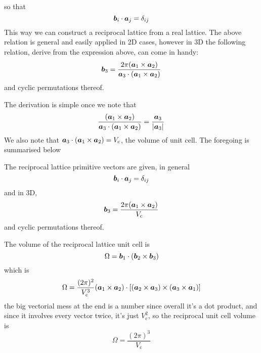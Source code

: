 so that
\begin{equation}
	\boldsymbol{b}_i\cdot\boldsymbol{a}_j=\delta_{ij}
\end{equation}
This way we can construct a reciprocal lattice from a real lattice. The above relation is general and easily applied in 2D cases, however in 3D the following relation, derive from the expression above, can come in handy:
\begin{equation}
	\boldsymbol{b}_3=\frac{2\pi(\boldsymbol{a}_1\times\boldsymbol{a}_2)}{\boldsymbol{a}_3\cdot(\boldsymbol{a}_1\times\boldsymbol{a}_2)}
\end{equation}
and cyclic permutations thereof.\par 
The derivation is simple once we note that 
\begin{equation}
	\frac{(\boldsymbol{a}_1\times\boldsymbol{a}_2)}{\boldsymbol{a}_3\cdot(\boldsymbol{a}_1\times\boldsymbol{a}_2)}=\frac{\boldsymbol{a}_3}{|\boldsymbol{a}_3|}
\end{equation}
We also note that $\boldsymbol{a}_3\cdot(\boldsymbol{a}_1\times\boldsymbol{a}_2)=V_{\mathrm{c}}$, the volume of unit cell. 
The foregoing is summarised below
\begin{thrm}
The reciprocal lattice primitive vectors are given, in general
\begin{equation}
	\boldsymbol{b}_i\cdot\boldsymbol{a}_j=\delta_{ij}
\end{equation}
and in 3D, 
\begin{equation}
	\boldsymbol{b}_3=\frac{2\pi(\boldsymbol{a}_1\times\boldsymbol{a}_2)}{V_{\mathrm{c}}}
\end{equation}
and cyclic permutations thereof.
\end{thrm}
The volume of the reciprocal lattice unit cell is 
\begin{equation}
	\Omega=\boldsymbol{b}_1\cdot(\boldsymbol{b}_2\times\boldsymbol{b}_3)
\end{equation}
which is 
\begin{equation}
	\Omega=\frac{(2\pi)^2}{V_{\mathrm{c}}^3}(\boldsymbol{a}_1\times\boldsymbol{a}_2)\cdot[(\boldsymbol{a}_2\times\boldsymbol{a}_3)\times(\boldsymbol{a}_3\times\boldsymbol{a}_1)]
\end{equation}
the big vectorial mess at the end is a number since overall it's a dot product, and since it involves every vector twice, it's just $V_{\mathrm{c}}^2$, so the reciprocal unit cell volume is 
\begin{equation}
	\Omega=\frac{(2\pi)^3}{V_{\mathrm{c}}}
\end{equation}
